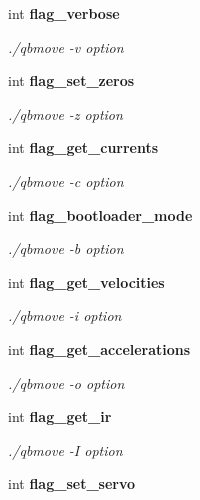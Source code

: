 \begin{DoxyCompactItemize}
\mbox{\label{structglobal__args_a2d410324c656ed3cf62239ef07f19df6}} 
int \textbf{ flag\+\_\+verbose}
\begin{DoxyCompactList}\small\item\em ./qbmove -\/v option \end{DoxyCompactList}\item 
\mbox{\label{structglobal__args_a66d5c9e9750727f229d685d9399218d0}} 
int \textbf{ flag\+\_\+set\+\_\+zeros}
\begin{DoxyCompactList}\small\item\em ./qbmove -\/z option \end{DoxyCompactList}\item 
\mbox{\label{structglobal__args_a884582f66057291a6a1f030d5d46d9d5}} 
int \textbf{ flag\+\_\+get\+\_\+currents}
\begin{DoxyCompactList}\small\item\em ./qbmove -\/c option \end{DoxyCompactList}\item 
\mbox{\label{structglobal__args_a8488439bc3473b5fb08964d06b51b80a}} 
int \textbf{ flag\+\_\+bootloader\+\_\+mode}
\begin{DoxyCompactList}\small\item\em ./qbmove -\/b option \end{DoxyCompactList}\item 
\mbox{\label{structglobal__args_aa9b8d91302ac6dbb99023c9363c352f8}} 
int \textbf{ flag\+\_\+get\+\_\+velocities}
\begin{DoxyCompactList}\small\item\em ./qbmove -\/i option \end{DoxyCompactList}\item 
\mbox{\label{structglobal__args_af72013af180143fd3cce334fca450bec}} 
int \textbf{ flag\+\_\+get\+\_\+accelerations}
\begin{DoxyCompactList}\small\item\em ./qbmove -\/o option \end{DoxyCompactList}\item 
\mbox{\label{structglobal__args_a24ec0f8144d1376bd72b06667b12b088}} 
int \textbf{ flag\+\_\+get\+\_\+ir}
\begin{DoxyCompactList}\small\item\em ./qbmove -\/I option \end{DoxyCompactList}\item 
\mbox{\label{structglobal__args_a3d4f1fdf9bfdbe27109015605252ff5c}} 
int \textbf{ flag\+\_\+set\+\_\+servo}

\end{DoxyCompactItemize}
